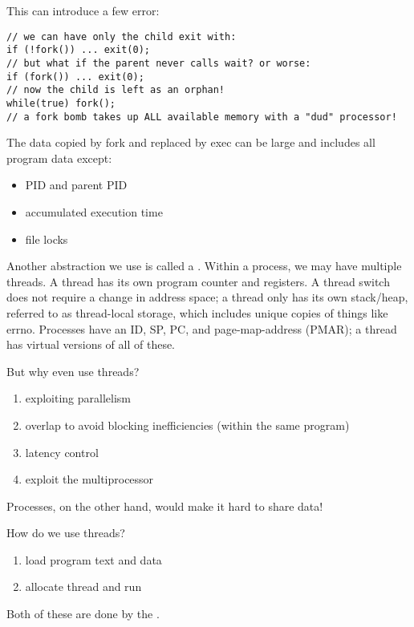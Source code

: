 \documentclass[../../lecture_notes.tex]{subfiles}
\begin{document}
This can introduce a few error:
\begin{lstlisting}
// we can have only the child exit with:
if (!fork()) ... exit(0);
// but what if the parent never calls wait? or worse: 
if (fork()) ... exit(0);
// now the child is left as an orphan!
while(true) fork();
// a fork bomb takes up ALL available memory with a "dud" processor!
\end{lstlisting}

The data copied by fork and replaced by exec can be large and includes all program data except:
\begin{itemize}
\item PID and parent PID
\item accumulated execution time
\item file locks
\end{itemize}

Another abstraction we use is called a . Within a process, we may have multiple threads. A thread has its own program counter and registers. A thread switch does not require a change in address space; a thread only has its own stack/heap, referred to as thread-local storage, which includes unique copies of things like errno.
Processes have an ID, SP, PC, and page-map-address (PMAR); a thread has virtual versions of all of these.


But why even use threads?
\begin{enumerate}[nosep]
\item exploiting parallelism
\item overlap to avoid blocking inefficiencies (within the same program)
\item latency control
\item exploit the multiprocessor
\end{enumerate}
Processes, on the other hand, would make it hard to share data!


How do we use threads?
\begin{enumerate}[nosep]
\item load program text and data
\item allocate thread and run
\end{enumerate}
Both of these are done by the .
\end{document}
